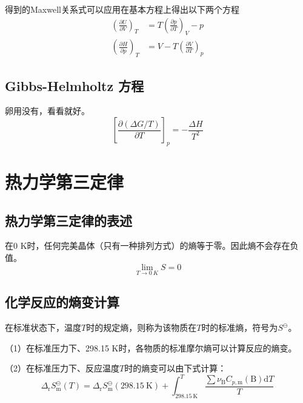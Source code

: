 \documentclass[lang=cn,newtx,10pt,scheme=chinese]{elegantbook}
\begin{document}
得到的Maxwell关系式可以应用在基本方程上得出以下两个方程
\begin{equation}
	\begin{aligned}
		\left ( \frac{\partial U}{\partial V}  \right )_T &= T\left ( \frac{\partial p}{\partial T}  \right )_V-p \\[1.5ex] 
		\left ( \frac{\partial H}{\partial p}  \right )_T &= V-T\left ( \frac{\partial V}{\partial T}  \right )_p   
	\end{aligned}
\end{equation}

\subsection{Gibbs-Helmholtz 方程}
卵用没有，看看就好。
\begin{equation}
	\left [ \frac{\partial (\Delta G/T)}{\partial T}  \right ]_p=-\frac{\Delta H}{T^2} 
\end{equation}

\section{热力学第三定律}
\subsection{热力学第三定律的表述}
\begin{theorem}[热力学第三定律]
	在0 K时，任何完美晶体（只有一种排列方式）的熵等于零。因此熵不会存在负值。
	\begin{equation}
		\lim_{T \to 0 \ K}S=0 
	\end{equation}
\end{theorem}

\subsection{化学反应的熵变计算}
在标准状态下，温度$T$时的规定熵，则称为该物质在$T$时的标准熵，符号为$S^\ominus$。

（1）在标准压力下、298.15 K时，各物质的标准摩尔熵可以计算反应的熵变。

（2）在标准压力下、反应温度$T$时的熵变可以由下式计算：
\begin{equation}
	\Delta_\mathrm{r}S^\ominus_\mathrm{m}(T) = \Delta_\mathrm{r}S^\ominus_\mathrm{m}(298.15 \ \mathrm{K} ) + \int_{298.15 \ \mathrm{K} }^{T}\frac{\sum \nu _\mathrm{B}C_{p,\mathrm{m}}(\mathrm{B} ) \mathrm{d}T }{T}  
\end{equation}
\end{document}
